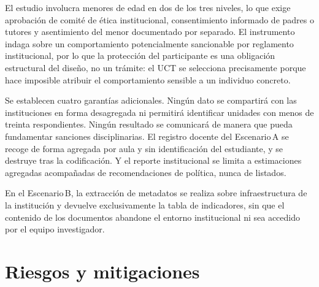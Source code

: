\documentclass[11pt,a4paper]{article}
\begin{document}
El estudio involucra menores de edad en dos de los tres niveles, lo que exige aprobación de comité de ética institucional, consentimiento informado de padres o tutores y asentimiento del menor documentado por separado. El instrumento indaga sobre un comportamiento potencialmente sancionable por reglamento institucional, por lo que la protección del participante es una obligación estructural del diseño, no un trámite: el UCT se selecciona precisamente porque hace imposible atribuir el comportamiento sensible a un individuo concreto.

Se establecen cuatro garantías adicionales. Ningún dato se compartirá con las instituciones en forma desagregada ni permitirá identificar unidades con menos de treinta respondientes. Ningún resultado se comunicará de manera que pueda fundamentar sanciones disciplinarias. El registro docente del Escenario\,A se recoge de forma agregada por aula y sin identificación del estudiante, y se destruye tras la codificación. Y el reporte institucional se limita a estimaciones agregadas acompañadas de recomendaciones de política, nunca de listados.

En el Escenario\,B, la extracción de metadatos se realiza sobre infraestructura de la institución y devuelve exclusivamente la tabla de indicadores, sin que el contenido de los documentos abandone el entorno institucional ni sea accedido por el equipo investigador.

\section{Riesgos y mitigaciones}
\end{document}
